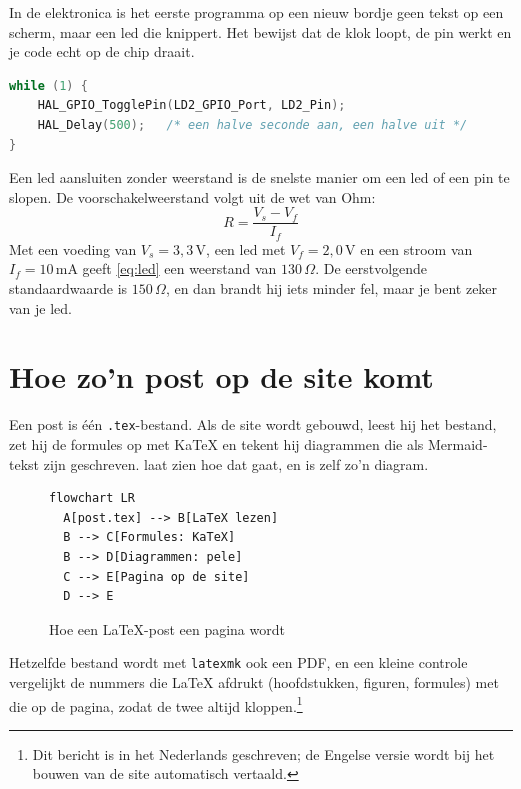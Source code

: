 \documentclass[11pt,a4paper]{article}
\begin{document}
In de elektronica is het eerste programma op een nieuw bordje geen tekst op een scherm, maar een led die knippert. Het bewijst dat de klok loopt, de pin werkt en je code echt op de chip draait.

\begin{lstlisting}[language=c, title=blink.c]
while (1) {
    HAL_GPIO_TogglePin(LD2_GPIO_Port, LD2_Pin);
    HAL_Delay(500);   /* een halve seconde aan, een halve uit */
}
\end{lstlisting}

Een led aansluiten zonder weerstand is de snelste manier om een led of een pin te slopen. De voorschakelweerstand volgt uit de wet van Ohm:
\begin{equation}
  R = \frac{V_s - V_f}{I_f}
  \label{eq:led}
\end{equation}
Met een voeding van $V_s = 3{,}3\,\mathrm{V}$, een led met $V_f = 2{,}0\,\mathrm{V}$ en een stroom van $I_f = 10\,\mathrm{mA}$ geeft \eqref{eq:led} een weerstand van $130\,\Omega$. De eerstvolgende standaardwaarde is $150\,\Omega$, en dan brandt hij iets minder fel, maar je bent zeker van je led.

\section{Hoe zo'n post op de site komt}

Een post is één \texttt{.tex}-bestand. Als de site wordt gebouwd, leest hij het bestand, zet hij de formules op met KaTeX en tekent hij diagrammen die als Mermaid-tekst zijn geschreven.  laat zien hoe dat gaat, en is zelf zo'n diagram.

\begin{figure}
\begin{lstlisting}[language=mermaid, title={Van .tex-bestand naar pagina}]
flowchart LR
  A[post.tex] --> B[LaTeX lezen]
  B --> C[Formules: KaTeX]
  B --> D[Diagrammen: pele]
  C --> E[Pagina op de site]
  D --> E
\end{lstlisting}
\caption{Hoe een LaTeX-post een pagina wordt}
\label{fig:pipeline}
\end{figure}

Hetzelfde bestand wordt met \texttt{latexmk} ook een PDF, en een kleine controle vergelijkt de nummers die LaTeX afdrukt (hoofdstukken, figuren, formules) met die op de pagina, zodat de twee altijd kloppen.\footnote{Dit bericht is in het Nederlands geschreven; de Engelse versie wordt bij het bouwen van de site automatisch vertaald.}
\end{document}
